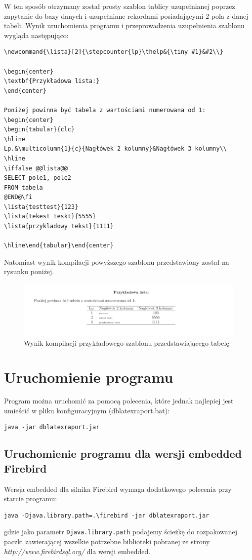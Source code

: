 W ten sposób otrzymany został prosty szablon tablicy uzupełnianej poprzez zapytanie do bazy danych i uzupełniane rekordami posiadającymi 2 pola z danej tabeli. Wynik uruchomienia programu i przeprowadzenia uzupełnienia szablonu wygląda następująco:
\begin{lstlisting}
\newcommand{\lista}[2]{\stepcounter{lp}\thelp&{\tiny #1}&#2\\}

\begin{center}
\textbf{Przykładowa lista:} 
\end{center}

Poniżej powinna być tabela z wartościami numerowana od 1:
\begin{center}
\begin{tabular}{clc}
\hline
Lp.&\multicolumn{1}{c}{Nagłówek 2 kolumny}&Nagłówek 3 kolumny\\
\hline
\iffalse @@lista@@
SELECT pole1, pole2
FROM tabela
@END@\fi
\lista{testtest}{123}
\lista{tekest teskt}{5555}
\lista{przykladowy tekst}{1111}

\hline\end{tabular}\end{center}
\end{lstlisting}

Natomiast wynik kompilacji powyższego szablonu przedstawiony został na rysunku poniżej.
\begin{figure}[h]
    \centering
    \label{fig:przykladszablon}
    \includegraphics[width=1\textwidth]{rys/instrukcja/szablon.png}
    \caption{Wynik kompilacji przykładowego szablonu przedstawiającego tabelę}
\end{figure}

\section{Uruchomienie programu}

Program można uruchomić za pomocą polecenia, które jednak najlepiej jest umieścić w pliku konfiguracyjnym (dblatexraport.bat):
\begin{lstlisting}
java -jar dblatexraport.jar
\end{lstlisting}

\subsection{Uruchomienie programu dla wersji embedded Firebird}

Wersja embedded dla silnika Firebird wymaga dodatkowego polecenia przy starcie programu:
\begin{lstlisting}
java -Djava.library.path=.\firebird -jar dblatexraport.jar
\end{lstlisting}
gdzie jako parametr \texttt{Djava.library.path} podajemy ścieżkę do rozpakowanej paczki zawierającej wszelkie potrzebne biblioteki pobranej ze strony \emph{http://www.firebirdsql.org/} dla wersji embedded.